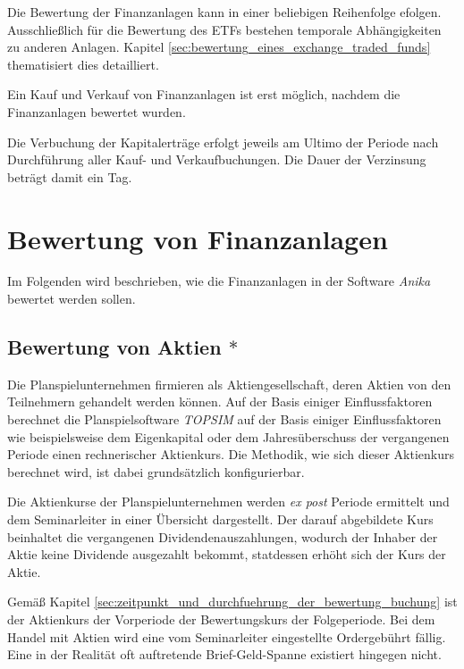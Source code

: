 \documentclass[12pt, a4paper]{article}
\begin{document}
Die Bewertung der Finanzanlagen kann in einer beliebigen Reihenfolge efolgen.
Ausschließlich für die Bewertung des \glspl{ETF} bestehen temporale Abhängigkeiten zu anderen Anlagen. Kapitel \ref{sec:bewertung_eines_exchange_traded_funds} thematisiert dies detailliert.

Ein Kauf und Verkauf von Finanzanlagen ist erst möglich, nachdem die Finanzanlagen bewertet wurden.

Die Verbuchung der Kapitalerträge erfolgt jeweils am Ultimo der Periode nach Durchführung aller Kauf- und Verkaufbuchungen.
Die Dauer der Verzinsung beträgt damit ein Tag.

\section{Bewertung von Finanzanlagen}
\label{sec:bewertung_von_finanzanlagen}
Im Folgenden wird beschrieben, wie die Finanzanlagen in der Software \textit{Anika} bewertet werden sollen.

\subsection{Bewertung von Aktien $\ast$}
\label{sec:bewertung_von_aktien}
Die Planspielunternehmen firmieren als Aktiengesellschaft, deren Aktien von den Teilnehmern gehandelt werden können.
Auf der Basis einiger Einflussfaktoren berechnet die Planspielsoftware \textit{TOPSIM} auf der Basis einiger Einflussfaktoren wie beispielsweise dem Eigenkapital oder dem Jahresüberschuss der vergangenen Periode einen rechnerischer Aktienkurs.
Die Methodik, wie sich dieser Aktienkurs berechnet wird, ist dabei grundsätzlich konfigurierbar.

Die Aktienkurse der Planspielunternehmen werden \textit{ex post} Periode ermittelt und dem Seminarleiter in einer Übersicht dargestellt. Der darauf abgebildete Kurs beinhaltet die vergangenen Dividendenauszahlungen, wodurch der Inhaber der Aktie keine Dividende ausgezahlt bekommt, statdessen erhöht sich der Kurs der Aktie.

Gemäß Kapitel \ref{sec:zeitpunkt_und_durchfuehrung_der_bewertung_buchung} ist der Aktienkurs der Vorperiode der Bewertungskurs der Folgeperiode.
Bei dem Handel mit Aktien wird eine vom Seminarleiter eingestellte Ordergebührt fällig. Eine in der Realität oft auftretende Brief-Geld-Spanne existiert hingegen nicht.

\end{document}
